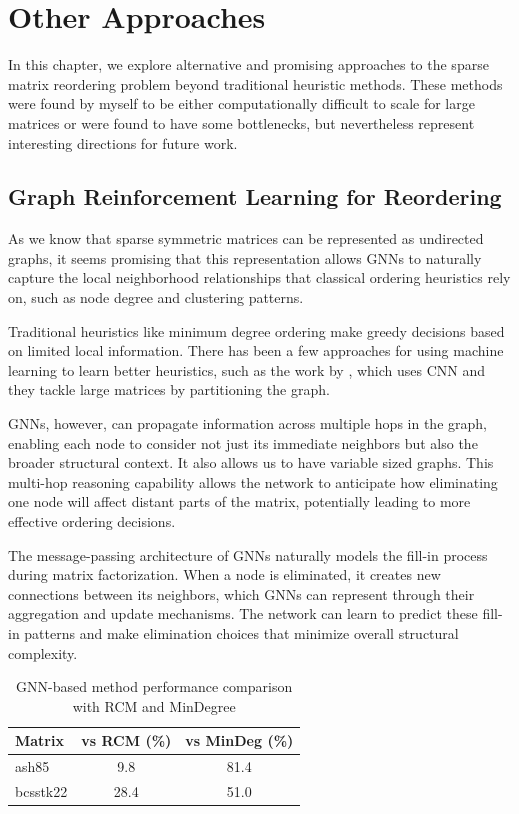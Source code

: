 \chapter{Other Approaches}
\label{ch:other_approaches}

In this chapter, we explore alternative and promising approaches to the sparse matrix reordering problem beyond traditional heuristic methods. These methods were found by myself to be either computationally difficult to scale for large matrices or were found to have some bottlenecks, but nevertheless represent interesting directions for future work. 

\section{Graph Reinforcement Learning for Reordering}

As we know that sparse symmetric matrices can be represented as undirected graphs, it seems promising that this representation allows GNNs to naturally capture the local neighborhood relationships that classical ordering heuristics rely on, such as node degree and clustering patterns.

Traditional heuristics like minimum degree ordering make greedy decisions based on limited local information. There has been a few approaches for using machine learning to learn better heuristics, such as the work by \cite{dasgupta_alpha_2023}, which uses CNN and they tackle large matrices by partitioning the graph. 

GNNs, however, can propagate information across multiple hops in the graph, enabling each node to consider not just its immediate neighbors but also the broader structural context. It also allows us to have variable sized graphs. This multi-hop reasoning capability allows the network to anticipate how eliminating one node will affect distant parts of the matrix, potentially leading to more effective ordering decisions.

The message-passing architecture of GNNs naturally models the fill-in process during matrix factorization. When a node is eliminated, it creates new connections between its neighbors, which GNNs can represent through their aggregation and update mechanisms. The network can learn to predict these fill-in patterns and make elimination choices that minimize overall structural complexity.

\begin{table}[htbp]
    \centering
    \begin{tabular}{lcc}
        \toprule
        \textbf{Matrix} & \textbf{vs RCM (\%)} & \textbf{vs MinDeg (\%)} \\
        \midrule
        ash85 & 9.8 & 81.4 \\
        bcsstk22 & 28.4 & 51.0 \\
        \bottomrule
    \end{tabular}
    \caption{GNN-based method performance comparison with RCM and MinDegree}
    \label{tab:graphrl_small}
\end{table}

